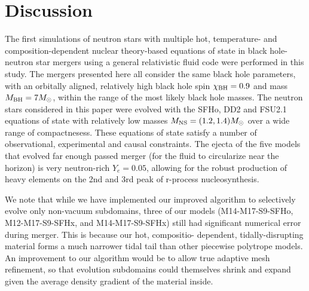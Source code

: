 %	
%
%	

%	
%
%	
%
%	


\section{Discussion}

The first simulations of neutron stars with multiple hot, temperature- and composition-dependent nuclear theory-based equations of state in black hole-neutron star mergers using a general relativistic fluid code were performed in this study.  
The mergers presented here all consider the same black hole parameters, with an orbitally aligned, relatively high black hole spin $\chi_{\rm BH} = 0.9$ and  mass $M_{\rm BH} = 7 M_\odot$, within the range of the most likely black hole masses.  
The neutron stars considered in this paper were evolved with the SFHo, DD2 and FSU2.1 equations of state with relatively low masses $M_{\rm NS} = (1.2,1.4) M_\odot$ over a wide range of compactnesess.  
These equations of state satisfy a number of observational, experimental and causal constraints.  
The ejecta of the five models that evolved far enough passed merger (for the fluid to circularize near the horizon) is very neutron-rich $Y_e = 0.05$, allowing for the robust production of heavy elements on the 2nd and 3rd peak of r-process nucleosynthesis.

We note that while we have implemented our improved algorithm to selectively evolve only non-vacuum subdomains, three of our models (M14-M17-S9-SFHo, M12-M17-S9-SFHx, and M14-M17-S9-SFHx) still had significant numerical error during merger. 
This is because our hot, compositio- dependent, tidally-disrupting material forms a much narrower tidal tail than other piecewise polytrope models.
An improvement to our algorithm would be to allow true adaptive mesh refinement, so that evolution subdomains could themselves shrink and expand given the average density gradient of the material inside.

